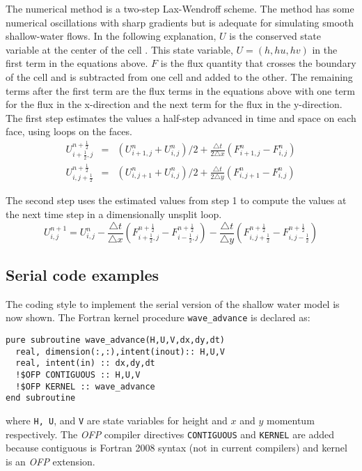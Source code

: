 The numerical method is a two-step Lax-Wendroff scheme. The method
has some numerical oscillations with sharp gradients but is adequate
for simulating smooth shallow-water flows. In the following explanation,
$U$ is the conserved state variable at the center of the cell . This
state variable, $U=(h,hu,hv)$ in the first term in the equations
above. $F$ is the flux quantity that crosses the boundary of the cell
and is subtracted from one cell and added to the other. The remaining
terms after the first term are the flux terms in the equations above
with one term for the flux in the x-direction and the next term for
the flux in the y-direction. The first step estimates the values a
half-step advanced in time and space on each face, using loops on
the faces.\begin{eqnarray*}
U_{i+\frac{1}{2},j}^{n+\frac{1}{2}} & = & (U_{i+1,j}^{n}+U_{i,j}^{n})/2+\frac{\triangle t}{2\triangle x}\left(F_{i+1,j}^{n}-F_{i,j}^{n}\right)\\
U_{i,j+\frac{1}{2}}^{n+\frac{1}{2}} & = & (U_{i,j+1}^{n}+U_{i,j}^{n})/2+\frac{\triangle t}{2\triangle y}\left(F_{i,j+1}^{n}-F_{i,j}^{n}\right)\end{eqnarray*}


The second step uses the estimated values from step 1 to compute the
values at the next time step in a dimensionally unsplit loop.\[
U_{i,j}^{n+1}=U_{i,j}^{n}-\frac{\triangle t}{\triangle x}(F_{i+\frac{1}{2},j}^{n+\frac{1}{2}}-F_{i-\frac{1}{2},j}^{n+\frac{1}{2}})-\frac{\triangle t}{\triangle y}(F_{i,j+\frac{1}{2}}^{n+\frac{1}{2}}-F_{i,j-\frac{1}{2}}^{n+\frac{1}{2}})\]


\subsection{Serial code examples}

The coding style to implement the serial version of the shallow water model
is now shown.  The Fortran kernel procedure {\tt wave\_advance} 
is declared as:

{\small
\begin{verbatim}
pure subroutine wave_advance(H,U,V,dx,dy,dt)
  real, dimension(:,:),intent(inout):: H,U,V
  real, intent(in) :: dx,dy,dt
  !$OFP CONTIGUOUS :: H,U,V
  !$OFP KERNEL :: wave_advance
end subroutine
\end{verbatim}
}

\noindent
where {\tt H, U}, and {\tt V} are state variables for height and
$x$ and $y$ momentum respectively.  The \emph{OFP} compiler directives
{\tt CONTIGUOUS} and {\tt KERNEL} are added because contiguous is Fortran
2008 syntax (not in current compilers) and kernel is an \emph{OFP} extension.


